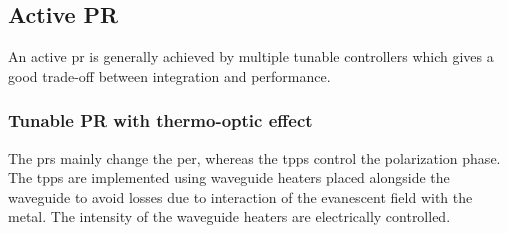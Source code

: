 \documentclass[../report.tex]{subfiles}
\begin{document}
		\subsection{Active PR}\label{sec:active_pr}
An active \gls{pr} is generally achieved by multiple tunable controllers which gives a good trade-off between integration and performance. 
	\subsubsection{Tunable PR with thermo-optic effect} \label{concept:tpps} The \gls{pr}s mainly change the \gls{per}, whereas the \gls{tpps} control the polarization phase. The \gls{tpps} are implemented using waveguide heaters placed alongside the waveguide to avoid losses due to interaction of the evanescent field with the metal. The intensity of the waveguide heaters are electrically controlled.	
	
\end{document}

